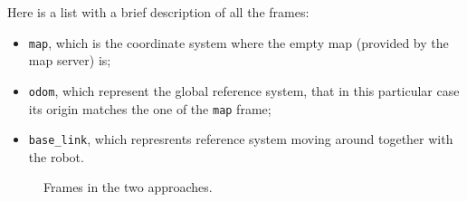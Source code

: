 \documentclass[11pt,a4paper]{article}
\begin{document}
Here is a list with a brief description of all the frames:
\begin{itemize}
    \item \texttt{map}, which is the coordinate system where the empty map (provided by the map server) is;
    \item \texttt{odom}, which represent the global reference system, that in this particular case its origin matches the one of the \texttt{map} frame;
    \item \texttt{base\_link}, which represrents reference system moving around together with the robot.
\end{itemize}

\begin{figure}[H]
    \centering
    \caption[]{Frames in the two approaches.}
\end{figure}
\end{document}
